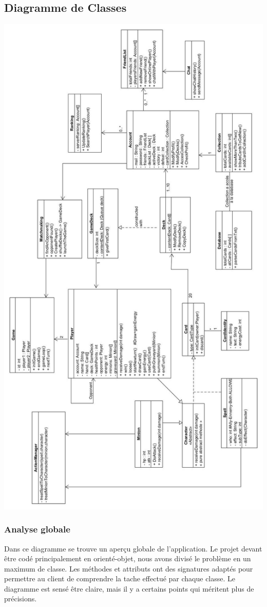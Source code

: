 \subsection{Diagramme de Classes}
{
\includegraphics[width=1.1\textwidth,height=1.3\textwidth]{Images/ClassDiagramV.jpg}
}
\subsubsection{Analyse globale}
{\noindent Dans ce diagramme se trouve un aperçu globale de l'application. Le projet devant être codé principalement en orienté-objet, nous avons divisé le problème en un maximum de classe. Les méthodes et attributs ont des signatures adaptés pour permettre au client de comprendre la tache effectué par chaque classe. Le diagramme est sensé être claire, mais il y a certains points qui méritent plus de précisions.}
